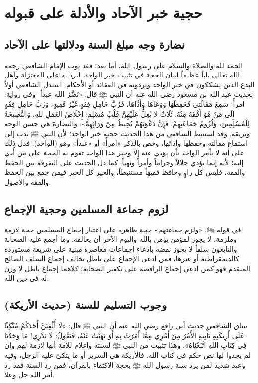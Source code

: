 \chapter{حجية خبر الآحاد والأدلة على قبوله}

\section{نضارة وجه مبلغ السنة ودلالتها على الآحاد}
الحمد لله والصلاة والسلام على رسول الله، أما بعد؛ فقد بوب الإمام الشافعي رحمه الله تعالى باباً عظيماً لبيان الحجة في تثبيت خبر الواحد، ليرد به على المعتزلة وأهل البدع الذين يشككون في خبر الواحد ويردونه في العقائد أو الأحكام.
استدل الشافعي أولاً بحديث عبد الله بن مسعود رضي الله عنه أن النبي ﷺ قال: «نَضَّرَ الله عبداً -وفي رواية: امرأً- سَمِعَ مَقَالَتي فَحَفِظَهَا وَوَعَاهَا وَأَدَّاهَا، فَرُبَّ حَامِلِ فِقْهٍ غَيْرُ فَقِيهٍ، وَرُبَّ حَامِلِ فِقْهٍ إِلَى مَنْ هُوَ أَفْقَهُ مِنْهُ. ثَلَاثٌ لا يُغِلُّ عَلَيْهِنَّ قَلْبُ مُسْلِمٍ: إِخْلَاصُ العَمَلِ للهِ، وَالنَّصِيحَةُ لِلْمُسْلِمِينَ، وَلُزُومُ جَمَاعَتِهِمْ، فَإِنَّ دَعْوَتَهُمْ تُحِيطُ مِنْ وَرَائِهِمْ».
والنضارة هي حسن الوجه وبريقه. وقد استنبط الشافعي من هذا الحديث حجية خبر الواحد؛ لأن النبي ﷺ ندب إلى استماع مقالته وحفظها وأدائها، وخص بالذكر «امرأً» أو «عبداً» وهو (الواحد). فدل ذلك على أنه لا يأمر الواحد بأن يؤدي عنه إلا وخبر هذا الواحد تقوم به الحجة على من أُدي إليه؛ لأنه إنما يؤدي حلالاً وحراماً وأمراً ونهياً. 
كما دل الحديث على التفرقة بين الحفظ والفقه، فليس كل راوٍ وحافظ فقيهاً مستنبطاً، والخير كل الخير فيمن جمع بين الحفظ والفقه والأصول.

\section{لزوم جماعة المسلمين وحجية الإجماع}
في قوله ﷺ: «ولزم جماعتهم» حجة ظاهرة على اعتبار إجماع المسلمين حجة لازمة وملزمة، لا يجوز لمؤمن يؤمن بالله واليوم الآخر أن يخالفه. وما أجمع عليه الصحابة والتابعون سلفاً لا يجوز نقضه بادعاء إجماعات معاصرة مبنية على شريعة مستوردة كالديمقراطية أو غيرها، فمن ادعى الإجماع على باطل يخالف إجماع السلف الصالح المتقدم فهو كمن ادعى إجماع الرافضة على تكفير الصحابة؛ كلاهما إجماع باطل لا وزن له في دين الله.

\section{وجوب التسليم للسنة (حديث الأريكة)}
ساق الشافعي حديث أبي رافع رضي الله عنه أن النبي ﷺ قال: «لَا أُلْفِيَنَّ أَحَدَكُمْ مُتَّكِئًا عَلَى أَرِيكَتِهِ يَأْتِيهِ الأَمْرُ مِنْ أَمْرِي مِمَّا أَمَرْتُ بِهِ أَوْ نَهَيْتُ عَنْهُ، فَيَقُولُ: لَا نَدْرِي! مَا وَجَدْنَا فِي كِتَابِ اللهِ اتَّبَعْنَاهُ». 
وهذا تثبيت من النبي ﷺ لسنته وإعلام للأمة أنها لازمة لهم وإن لم يجدوا لها نص حكم في كتاب الله. فالأريكة هي السرير أو ما يتكئ عليه الرجل، وفيه وعيد شديد لمن يرد سنة رسول الله ﷺ بحجة الاكتفاء بالقرآن، فمن رد السنة فقد رد أمر الله جل وعلا.

